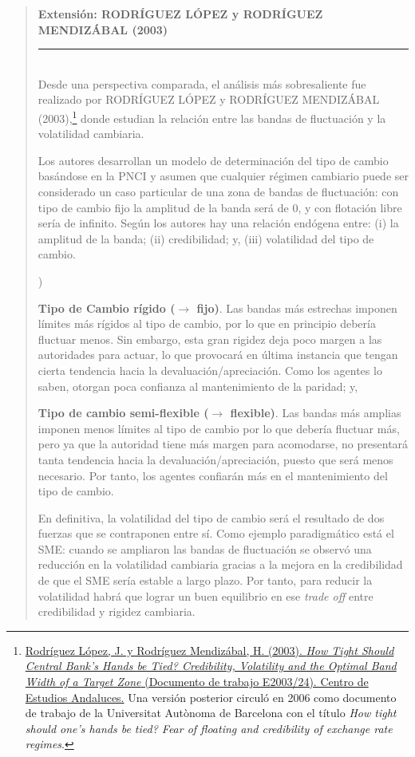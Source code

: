 \documentclass[10pt,a4paper]{article}
\newcounter{alphaitem}
\newenvironment{la}
      {\begin{list}{\alph{alphaitem})}{%
          \usecounter{alphaitem}%
          \setlength{\leftmargin}{1cm}%
          \setlength{\parskip}{3pt}%
          \setlength{\itemsep}{0pt}%
          \setlength{\parsep}{0pt}%
      }}
      {\end{list}}
\newenvironment{specialblock}[1]{%
      \begin{quote} %
      \small %
      \noindent\textbf{#1}\\[-0.3em] %
      \rule{\linewidth}{0.4pt}\\[0.6em]}{
      \end{quote}}
\begin{document}
\begin{specialblock}{\textbf{Extensión}: RODRÍGUEZ LÓPEZ y RODRÍGUEZ MENDIZÁBAL (2003)}
  Desde una perspectiva comparada, el análisis más sobresaliente fue realizado por RODRÍGUEZ LÓPEZ y RODRÍGUEZ MENDIZÁBAL (2003),\footnote{%
      \href{https://www.centrodeestudiosandaluces.es/publicaciones/how-tight-should-central-banks-hands-be-tied-credibilityvolatility-and-the-optimal-band-width-of-a-target-zone}{Rodríguez López, J. y Rodríguez Mendizábal, H. (2003). \textit{How Tight Should Central Bank's Hands be Tied? Credibility, Volatility and the Optimal Band Width of a Target Zone} (Documento de trabajo E2003/24). Centro de Estudios Andaluces.} Una versión posterior circuló en 2006 como documento de trabajo de la Universitat Autònoma de Barcelona con el título \textit{How tight should one's hands be tied? Fear of floating and credibility of exchange rate regimes}.
  } donde estudian la relación entre las bandas de fluctuación y la volatilidad cambiaria. 

  Los autores desarrollan un modelo de determinación del tipo de cambio basándose en la PNCI y asumen que cualquier régimen cambiario puede ser considerado un caso particular de una zona de bandas de fluctuación: con tipo de cambio fijo la amplitud de la banda será de $0$, y con flotación libre sería de infinito. Según los autores hay una relación endógena entre: (i) la amplitud de la banda; (ii) credibilidad; y, (iii) volatilidad del tipo de cambio.
  \begin{la}
      \item \textbf{Tipo de Cambio rígido ($\to$ fijo)}. Las bandas más estrechas imponen límites más rígidos al tipo de cambio, por lo que en principio debería fluctuar menos. Sin embargo, esta gran rigidez deja poco margen a las autoridades para actuar, lo que provocará en última instancia que tengan cierta tendencia hacia la devaluación/apreciación. Como los agentes lo saben, otorgan poca confianza al mantenimiento de la paridad; y,
      \item \textbf{Tipo de cambio semi-flexible ($\to$ flexible)}. Las bandas más amplias imponen menos límites al tipo de cambio por lo que debería fluctuar más, pero ya que la autoridad tiene más margen para acomodarse, no presentará tanta tendencia hacia la devaluación/apreciación, puesto que será menos necesario. Por tanto, los agentes confiarán más en el mantenimiento del tipo de cambio. 
  \end{la}

  En definitiva, la volatilidad del tipo de cambio será el resultado de dos fuerzas que se contraponen entre sí. Como ejemplo paradigmático está el SME: cuando se ampliaron las bandas de fluctuación se observó una reducción en la volatilidad cambiaria gracias a la mejora en la credibilidad de que el SME sería estable a largo plazo. Por tanto, para reducir la volatilidad habrá que lograr un buen equilibrio en ese \textit{trade off} entre credibilidad y rigidez cambiaria. 
\end{specialblock}
\end{document}
